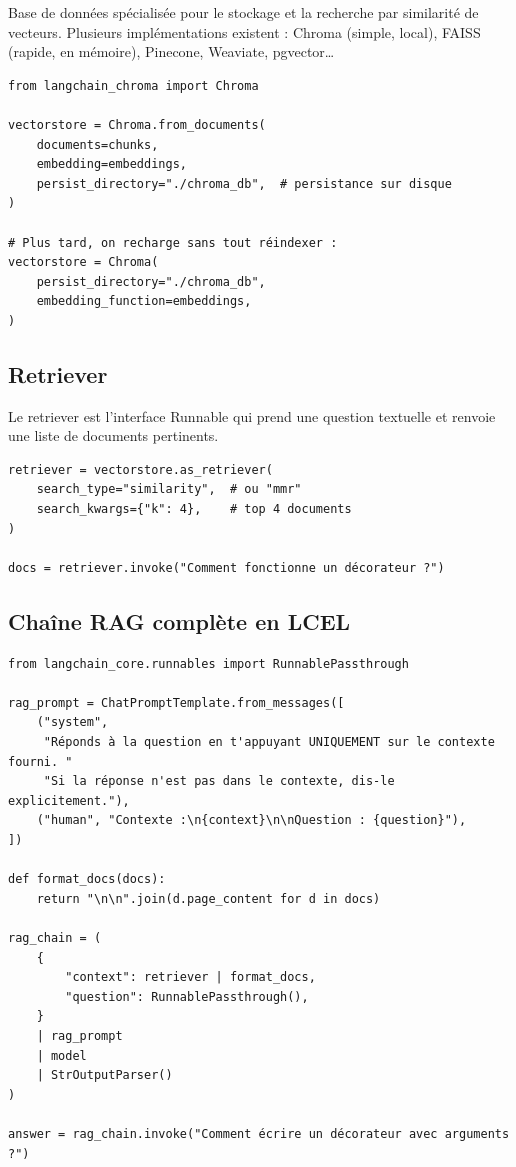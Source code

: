 \documentclass[11pt,a4paper]{article}
\begin{document}
Base de données spécialisée pour le stockage et la recherche par similarité de vecteurs. Plusieurs implémentations existent : Chroma (simple, local), FAISS (rapide, en mémoire), Pinecone, Weaviate, pgvector\ldots

\begin{verbatim}
from langchain_chroma import Chroma

vectorstore = Chroma.from_documents(
    documents=chunks,
    embedding=embeddings,
    persist_directory="./chroma_db",  # persistance sur disque
)

# Plus tard, on recharge sans tout réindexer :
vectorstore = Chroma(
    persist_directory="./chroma_db",
    embedding_function=embeddings,
)
\end{verbatim}

\subsection{Retriever}

Le retriever est l'interface Runnable qui prend une question textuelle et renvoie une liste de documents pertinents.

\begin{verbatim}
retriever = vectorstore.as_retriever(
    search_type="similarity",  # ou "mmr"
    search_kwargs={"k": 4},    # top 4 documents
)

docs = retriever.invoke("Comment fonctionne un décorateur ?")
\end{verbatim}

\subsection{Chaîne RAG complète en LCEL}

\begin{verbatim}
from langchain_core.runnables import RunnablePassthrough

rag_prompt = ChatPromptTemplate.from_messages([
    ("system",
     "Réponds à la question en t'appuyant UNIQUEMENT sur le contexte fourni. "
     "Si la réponse n'est pas dans le contexte, dis-le explicitement."),
    ("human", "Contexte :\n{context}\n\nQuestion : {question}"),
])

def format_docs(docs):
    return "\n\n".join(d.page_content for d in docs)

rag_chain = (
    {
        "context": retriever | format_docs,
        "question": RunnablePassthrough(),
    }
    | rag_prompt
    | model
    | StrOutputParser()
)

answer = rag_chain.invoke("Comment écrire un décorateur avec arguments ?")
\end{verbatim}
\end{document}
